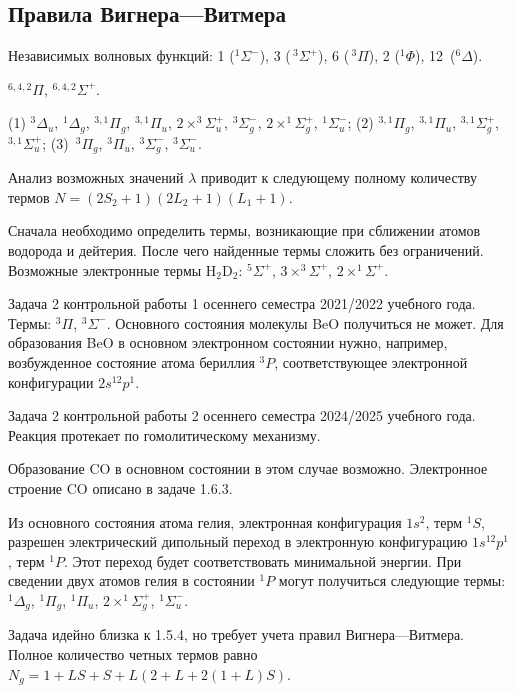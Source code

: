 \subsection{Правила Вигнера—Витмера}
 Независимых волновых функций: 1 ($^1\Sigma^-$), 3 ($\,^3\Sigma^+$), 6 ($\,^3\Pi$), 2 ($^1\Phi$), 12~($^6\Delta$). \par
{} $^{6,4,2}\Pi$, $^{6,4,2}\Sigma^+$.\par
{} (1) $^3\Delta_u$, $^1\Delta_g$, $^{3,1}\Pi_g$, $^{3,1}\Pi_u$, $2 \times ^{3}\Sigma_u^+$, $^3\Sigma^-_g$, $2 \times ^{1}\Sigma_g^+$, $^{1}\Sigma_u^-$; (2) $^{3,1}\Pi_g$, $^{3,1}\Pi_u$, $^{3,1}\Sigma^+_g$, $^{3,1}\Sigma^+_u$; (3)~$^3\Pi_g$, $^3\Pi_u$, $^3\Sigma^-_g$, $^3\Sigma^-_u$.\par
{} Анализ возможных значений $\lambda$ приводит к следующему полному количеству термов $ N = (2S_2+1)(2L_2+1)(L_1+1).$\par
{} Сначала необходимо определить термы, возникающие при сближении атомов водорода и дейтерия. После чего найденные термы сложить без ограничений. Возможные электронные термы H$_2$D$_2$: $^{5}\Sigma^+$, $3 \times ^{3}\Sigma^+$, $2 \times ^{1}\Sigma^+$.\par
{} Задача 2 контрольной работы 1 осеннего семестра 2021/2022 учебного года. Термы: $^3\Pi$, $^3\Sigma^-$. Основного состояния молекулы BeO получиться не может. Для образования BeO в основном электронном состоянии нужно, например, возбужденное состояние атома бериллия $^3P$, соответствующее электронной конфигурации $2s^12p^1$.\par
{} Задача 2 контрольной работы 2 осеннего семестра 2024/2025 учебного года. Реакция протекает по гомолитическому механизму.\par
{} Образование CO в основном состоянии в этом случае возможно. Электронное строение CO описано в задаче 1.6.3.\par
{} Из основного состояния атома гелия, электронная конфигурация $1s^2$, терм $^1S$, разрешен электрический дипольный переход в электронную конфигурацию $1s^12p^1$, терм $^1P$. Этот переход будет соответствовать минимальной энергии. При сведении двух атомов гелия в состоянии $^1P$ могут получиться следующие термы: $^1\Delta_g$, $^1\Pi_g$, $^1\Pi_u$, $2 \times ^1\Sigma^+_g$, $^1\Sigma^-_u$.\par
{} Задача идейно близка к 1.5.4, но требует учета правил Вигнера—Витмера. Полное количество четных термов равно $N_g = 1 + LS + S + L(2 + L + 2(1 + L)S)$.\par
\newpage

